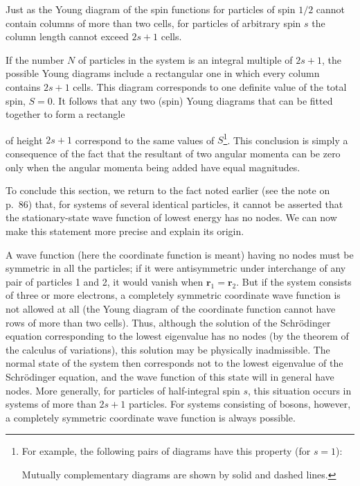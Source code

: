 Just as the Young diagram of the spin functions for particles of spin $1/2$ cannot contain columns of more than two cells, for particles of arbitrary spin $s$ the column length cannot exceed $2s+1$ cells.

If the number $N$ of particles in the system is an integral multiple of $2s+1$, the possible Young diagrams include a rectangular one in which every column contains $2s+1$ cells. This diagram corresponds to one definite value of the total spin, $S=0$. It follows that any two (spin) Young diagrams that can be fitted together to form a rectangle

of height $2s+1$ correspond to the same values of $S$\footnote{For example, the following pairs of diagrams have this property (for $s=1$):
\begin{center}\end{center}
Mutually complementary diagrams are shown by solid and dashed lines.}. This conclusion is simply a consequence of the fact that the resultant of two angular momenta can be zero only when the angular momenta being added have equal magnitudes.

To conclude this section, we return to the fact noted earlier (see the note on p.~86) that, for systems of several identical particles, it cannot be asserted that the stationary-state wave function of lowest energy has no nodes. We can now make this statement more precise and explain its origin.

A wave function (here the coordinate function is meant) having no nodes must be symmetric in all the particles; if it were antisymmetric under interchange of any pair of particles 1 and 2, it would vanish when $\mathbf r_1=\mathbf r_2$. But if the system consists of three or more electrons, a completely symmetric coordinate wave function is not allowed at all (the Young diagram of the coordinate function cannot have rows of more than two cells). Thus, although the solution of the Schrödinger equation corresponding to the lowest eigenvalue has no nodes (by the theorem of the calculus of variations), this solution may be physically inadmissible. The normal state of the system then corresponds not to the lowest eigenvalue of the Schrödinger equation, and the wave function of this state will in general have nodes. More generally, for particles of half-integral spin $s$, this situation occurs in systems of more than $2s+1$ particles. For systems consisting of bosons, however, a completely symmetric coordinate wave function is always possible.
